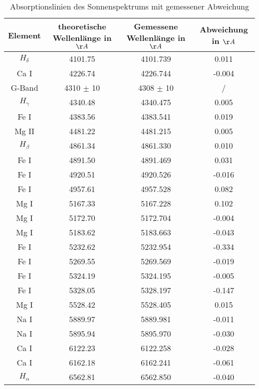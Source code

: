 \begin{table}[htbp]
\begin{center}
\begin{tabular}{c|c|c|c}
Element & theoretische Wellenlänge in $\AA$ & Gemessene Wellenlänge in $\AA$ & Abweichung in $\AA$ \\ 
\hline
$H_\delta$ & 4101.75 & 4101.739 & 0.011 \\
Ca I & 4226.74 & 4226.744 & -0.004 \\
G-Band & 4310 $\pm$ 10 & 4308 $\pm$ 10 & / \\ 
$H_\gamma$ & 4340.48 & 4340.475 & 0.005 \\ 
Fe I & 4383.56 & 4383.541 & 0.019 \\ 
Mg II & 4481.22 & 4481.215 & 0.005 \\ 
$H_\beta$ & 4861.34 & 4861.330 & 0.010 \\ 
Fe I & 4891.50 & 4891.469 & 0.031 \\ 
Fe I & 4920.51 & 4920.526 & -0.016 \\ 
Fe I & 4957.61 & 4957.528 & 0.082 \\ 
Mg I & 5167.33 & 5167.228 & 0.102 \\ 
Mg I & 5172.70 & 5172.704 & -0.004 \\ 
Mg I & 5183.62 & 5183.663 & -0.043 \\ 
Fe I & 5232.62 & 5232.954 & -0.334 \\ 
Fe I & 5269.55 & 5269.569 & -0.019 \\ 
Fe I & 5324.19 & 5324.195 & -0.005 \\ 
Fe I & 5328.05 & 5328.197 & -0.147 \\ 
Mg I & 5528.42 & 5528.405 & 0.015 \\ 
Na I & 5889.97 & 5889.981 & -0.011 \\ 
Na I & 5895.94 & 5895.970 & -0.030 \\ 
Ca I & 6122.23 & 6122.258 & -0.028 \\ 
Ca I & 6162.18 & 6162.241 & -0.061 \\ 
$H_\alpha$ & 6562.81 & 6562.850 & -0.040 \\ 
\end{tabular}
\end{center}
\caption{Absorptionslinien des Sonnenspektrums mit gemessener Abweichung}
\label{tab:Sonne}
\end{table}


